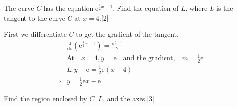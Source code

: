 \documentclass[12pt, a4 paper]{article}
\begin{document}
\begin{outline}[enumerate]
	\1 The curve $C$ has the equation $\mathrm{e}^{\frac{1}{2}x-1}$.
	\2 Find the equation of $L$, where $L$ is the tangent to the curve $C$ at $x=4$.\hfill[2]
	\begin{answer}
		First we differentiate $C$ to get the gradient of the tangent.
		\begin{align*}
			         & {\frac{\mathrm{d}}{\mathrm{d}x}}(\mathrm{e}^{\frac{1}{2}x-1}) = \frac{\mathrm{e}^{\frac{x}{2}-1}}{2} \\
			         & \textrm{At} \quad x=4, y=\mathrm{e} \quad \textrm{and the gradient,} \quad m=\frac{1}{2}\mathrm{e}   \\
			         & L: y-\mathrm{e} = \frac{1}{2}\mathrm{e}(x-4)                                                         \\
			\implies & y=\frac{1}{2}\mathrm{e}x - \mathrm{e}
		\end{align*}
	\end{answer}
	\2 Find the region enclosed by $C$, $L$, and the axes.\hfill[3]
	\begin{answer}
\end{answer}
\end{outline}
\end{document}
